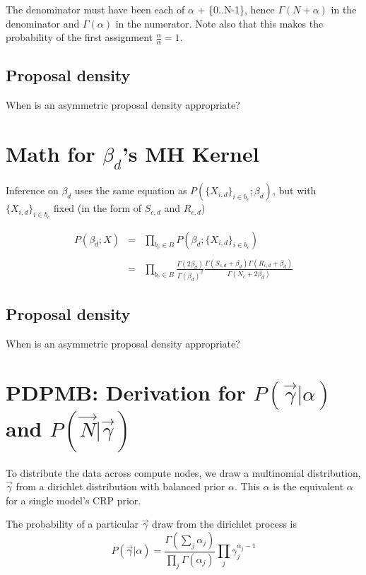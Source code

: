\documentclass{article}
\begin{document}
The denominator must have been each of $\alpha$ + \{0..N-1\}, hence $\Gamma(N+\alpha)$ in the denominator and $\Gamma(\alpha)$ in the numerator.  Note also that this makes the probability of the first assignment $\frac{\alpha}{\alpha}=1$.

\subsection{Proposal density}

When is an asymmetric proposal density appropriate?

\section{Math for $\beta_d$'s MH Kernel}

Inference on $\beta_d$ uses the same equation as $P(\{X_{i,d}\}_{i \in b_c};\beta_d)$, but with $\{X_{i,d}\}_{i \in b_c}$ fixed (in the form of $S_{c,d}$ and $R_{c,d}$)

\begin{equation}
\begin{matrix}
P(\beta_d;X) & = & \prod_{b_c \in B} P(\beta_d;\{X_{i,d}\}_{i \in b_c}) \\
\\
 & = & \prod_{b_c \in B} \frac{\Gamma(2\beta_d)}{\Gamma(\beta_d)^2} \frac{\Gamma(S_{c,d} + \beta_d)\Gamma(R_{c,d} + \beta_d)}{\Gamma(N_c + 2 \beta_d)}
\end{matrix}
\end{equation}

\subsection{Proposal density}

When is an asymmetric proposal density appropriate?


\section{PDPMB: Derivation for $P(\vec \gamma|\alpha)$ and $P(\vec N|\vec \gamma)$}

To distribute the data across compute nodes, we draw a multinomial distribution, $\vec \gamma$ from a dirichlet distribution with balanced prior $\alpha$.  This $\alpha$ is the equivalent $\alpha$ for a single model's CRP prior.

The probability of a particular $\vec \gamma$ draw from the dirichlet process is
\begin{equation}
P(\vec \gamma|\alpha) = \frac{\Gamma(\sum_j \alpha_j)}{\prod_j \Gamma(\alpha_j)} \prod_j \gamma_j^{\alpha_j-1}
\end{equation}
\end{document}
